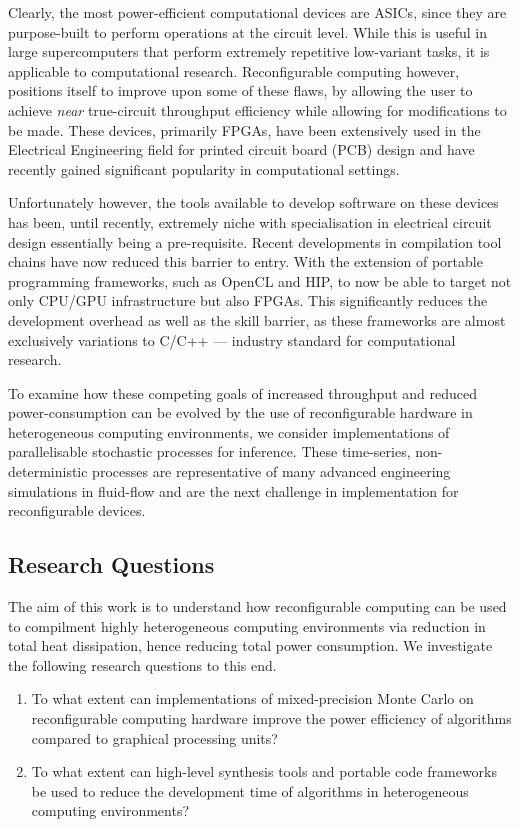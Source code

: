 \documentclass[11pt, a4paper]{article}
\begin{document}
	Clearly, the most power-efficient computational devices are ASICs, since they are purpose-built to perform operations at the circuit level. While this is useful in large supercomputers that perform extremely repetitive low-variant tasks, it is applicable to computational research. Reconfigurable computing however, positions itself to improve upon some of these flaws, by allowing the user to achieve \textit{near} true-circuit throughput efficiency while allowing for modifications to be made. These devices, primarily FPGAs, have been extensively used in the Electrical Engineering field for printed circuit board (PCB) design and have recently gained significant popularity in computational settings. 
	
	Unfortunately however, the tools available to develop softrware on these devices has been, until recently, extremely niche with specialisation in electrical circuit design essentially being a pre-requisite. Recent developments in compilation tool chains have now reduced this barrier to entry. With the extension of portable programming frameworks, such as OpenCL and HIP, to now be able to target not only CPU/GPU infrastructure but also FPGAs. This significantly reduces the development overhead as well as the skill barrier, as these frameworks are almost exclusively variations to C/C++ --- industry standard for computational research.
	
	To examine how these competing goals of increased throughput and reduced power-consumption can be evolved by the use of reconfigurable hardware in heterogeneous computing environments, we consider implementations of parallelisable stochastic processes for inference. These time-series, non-deterministic processes are representative of many advanced engineering simulations in fluid-flow and are the next challenge in implementation for reconfigurable devices. 

	\subsection{Research Questions}
	The aim of this work is to understand how reconfigurable computing can be used to compilment highly heterogeneous computing environments via reduction in total heat dissipation, hence reducing total power consumption. We investigate the following research questions to this end.
	\begin{enumerate}
		\item To what extent can implementations of mixed-precision Monte Carlo on reconfigurable computing hardware improve the power efficiency of algorithms compared to graphical processing units?
		\item To what extent can high-level synthesis tools and portable code frameworks be used to reduce the development time of algorithms in heterogeneous computing environments?
	\end{enumerate}
	
\end{document}
